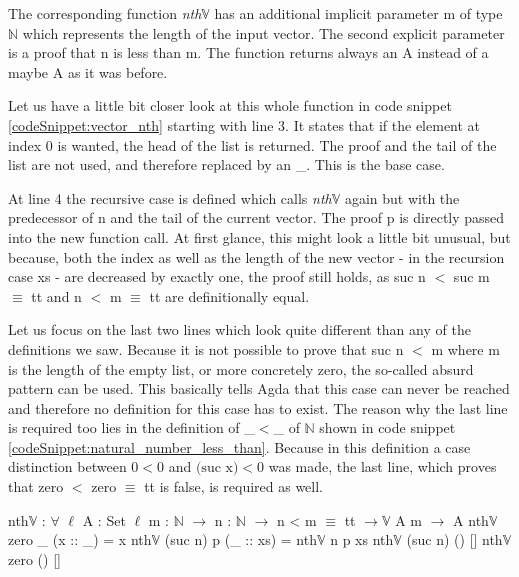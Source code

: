 The corresponding function \emph{nth$\mathbb{V}$} has an additional implicit parameter m of type $\mathbb{N}$ which represents the length of the input vector. 
The second explicit parameter is a proof that n is less than m. 
The function returns always an A instead of a maybe A as it was before.

Let us have a little bit closer look at this whole function in code snippet \ref{codeSnippet:vector_nth} starting with line 3. It states that if the element at index 0 is wanted, the head of the list is returned.
The proof and the tail of the list are not used, and therefore replaced by an \_. This is the base case.

At line 4 the recursive case is defined which calls \emph{nth$\mathbb{V}$} again but with the predecessor of n and the tail of the current vector.
The proof p is directly passed into the new function call. At first glance, this might look a little bit unusual, but because, both the index as well as the length of the new vector - in the recursion case xs - 
are decreased by exactly one, the proof still holds, as suc n $<$ suc m $\equiv$ tt and n $<$ m $\equiv$ tt are definitionally equal.

Let us focus on the last two lines which look quite different than any of the definitions we saw.
Because it is not possible to prove that suc n $<$ m where m is the length of the empty list, or more concretely zero, the so-called absurd pattern can be used. This basically tells Agda that this case can never be reached and therefore no definition for this case has to exist.
The reason why the last line is required too lies in the definition of \_$<$\_ of $\mathbb{N}$ shown in code snippet \ref{codeSnippet:natural_number_less_than}.
Because in this definition a case distinction between $0 < 0$ and $\text{(suc x)} < 0$ was made, the last line, which proves that zero $<$ zero $\equiv$ tt is false, is required as well.

\begin{codesnippet}[mathescape=true, caption={Definition of \emph{nth} function in Agda}, label={codeSnippet:vector_nth}]
nth$\mathbb{V}$ : $\forall$ {$\ell$} {A : Set $\ell$} {m : $\mathbb{N}$} $\rightarrow$
       n : $\mathbb{N}$ $\rightarrow$ n < m $\equiv$ tt $\rightarrow \mathbb{V}$ A m $\rightarrow$ A
nth$\mathbb{V}$ zero _ (x :: _) = x
nth$\mathbb{V}$ (suc n) p (_ :: xs) = nth$\mathbb{V}$ n p xs
nth$\mathbb{V}$ (suc n) () []
nth$\mathbb{V}$ zero () []
\end{codesnippet}

